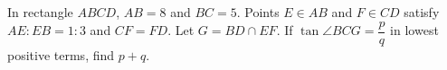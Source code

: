In rectangle $ABCD$, $AB=8$ and $BC=5$. Points $E\in AB$ and $F\in CD$ satisfy $AE:EB=1:3$ and $CF=FD$. Let $G=BD\cap EF$. If $\tan\angle BCG=\dfrac{p}{q}$ in lowest positive terms, find $p+q$.
